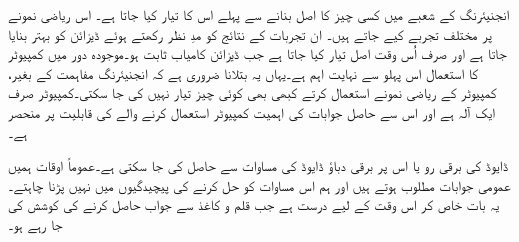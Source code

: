 	انجنیئرنگ کے شعبے میں کسی چیز کا اصل بنانے سے پہلے اس کا  تیار کیا جاتا ہے۔ اس ریاضی نمونے پر مختلف تجربے کیے جاتے ہیں۔ ان تجربات کے نتائج کو مدِ نظر رکھتے ہوئے ڈیزائن کو بہتر بنایا جاتا ہے اور صرف اُس وقت اصل تیار کیا جاتا ہے جب ڈیزائن کامیاب ثابت ہو۔موجودہ دور میں  کمپیوٹر کا استعمال اس پہلو سے نہایت اہم ہے۔یہاں یہ بتلانا ضروری ہے کہ انجنیئرنگ مفاہمت کے بغیر، کمپیوٹر کے ریاضی نمونے استعمال کرتے کبھی بھی کوئی چیز تیار نہیں کی جا سکتی۔کمپیوٹر صرف ایک آلہ ہے اور اس سے حاصل جوابات کی اہمیت کمپیوٹر استعمال کرنے والے کی قابلیت پر منحصر ہے۔

ڈایوڈ کی برقی رو یا اس پر برقی دباؤ ڈایوڈ کی مساوات سے حاصل کی جا سکتی ہے۔عموماً اوقات ہمیں عمومی جوابات مطلوب ہوتے ہیں اور ہم اس مساوات کو حل کرنے کی پیچیدگیوں میں نہیں پڑنا چاہتے۔یہ بات خاص کر اس وقت کے لیے درست ہے جب قلم و کاغذ سے جواب حاصل کرنے کی کوشش کی جا رہے ہو۔

